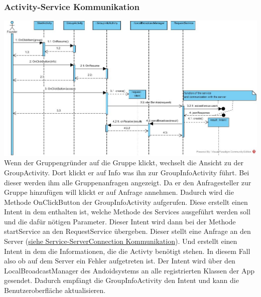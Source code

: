 \subsubsection{Activity-Service Kommunikation}

\includegraphics[width=1.1\textwidth]{Activity_Service.jpg}
	Wenn der Gruppengründer auf die Gruppe klickt, wechselt die Ansicht zu der GroupActivity. Dort klickt er auf Info was ihn zur GroupInfoActivity führt. Bei dieser werden ihm alle Gruppenanfragen angezeigt. Da er den Anfragesteller zur Gruppe  hinzufügen will klickt er auf Anfrage annehmen. Dadurch wird die Methode OnClickButton der GroupInfoActivity aufgerufen. Diese erstellt einen Intent in dem enthalten ist, welche Methode des Services ausgeführt werden soll und die dafür nötigen Parameter. 
Dieser Intent wird dann bei der Methode startService an den RequestService übergeben. Dieser stellt eine Anfrage an den Server (\hyperlink{ServiceServerConnection}{siehe Service-ServerConnection Kommunikation}). Und erstellt einen Intent in dem die Informationen, die die Activty benötigt stehen. In diesem Fall also ob auf dem Server ein Fehler aufgetreten ist.
Der Intent wird über den LocalBroadcastManager des Andoidsystems an alle registrierten Klassen der App gesendet. Dadurch empfängt die GroupInfoActivity den Intent und kann die Benutzeroberfläche aktualisieren.


\hypertarget{ServiceServerConnection}{}
